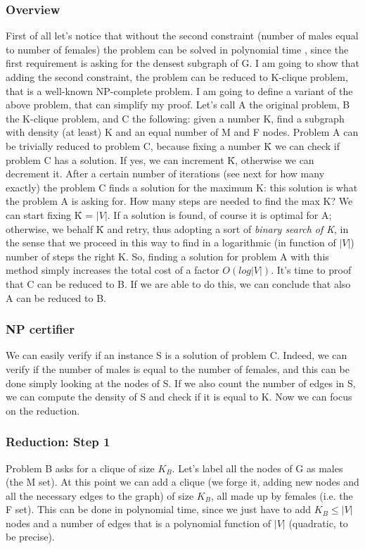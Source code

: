 \subsubsection{Overview}
First of all let's notice that without the second constraint (number of males equal to number of females) the problem can be solved in polynomial time \cite{Dense subgraph}, since the first requirement is asking for the densest subgraph of G. I am going to show that adding the second constraint, the problem can be reduced to K-clique problem, that is a well-known NP-complete problem. I am going to define a variant of the above problem, that can simplify my proof. Let's call A the original problem, B the K-clique problem, and C the following: given a number K, find a subgraph with density (at least) K and an equal number of M and F nodes.
Problem A can be trivially reduced to problem C, because fixing a number \={K} we can check if problem C has a solution. If yes, we can increment \={K}, otherwise we can decrement it. After a certain number of iterations (see next for how many exactly) the problem C finds a solution for the maximum K: this solution is what the problem A is asking for. How many steps are needed to find the max K? We can start fixing \={K} = $|V|$. If a solution is found, of course it is optimal for A; otherwise, we behalf \={K} and retry, thus adopting a sort of \textit{binary search of K}, in the sense that we proceed in this way to find in a logarithmic (in function of $|V|$) number of steps the right K. So, finding a solution for problem A with this method simply increases the total cost of a factor $O(log|V|)$. It's time to proof that C can be reduced to B. If we are able to do this, we can conclude that also A can be reduced to B.
\subsubsection{NP certifier}
We can easily verify if an instance S is a solution of problem C. Indeed, we can verify if the number of males is equal to the number of females, and this can be done simply looking at the nodes of S. If we also count the number of edges in S, we can compute the density of S and check if it is equal to K. Now we can focus on the reduction.
\subsubsection{Reduction: Step 1}
Problem B asks for a clique of size $K_B$. Let's label all the nodes of G as males (the M set). At this point we can add a clique (we forge it, adding new nodes and all the necessary edges to the graph) of size $K_B$, all made up by females (i.e. the F set). This can be done in polynomial time, since we just have to add $K_B \leq |V|$ nodes and a number of edges that is a polynomial function of $|V|$ (quadratic, to be precise). 

